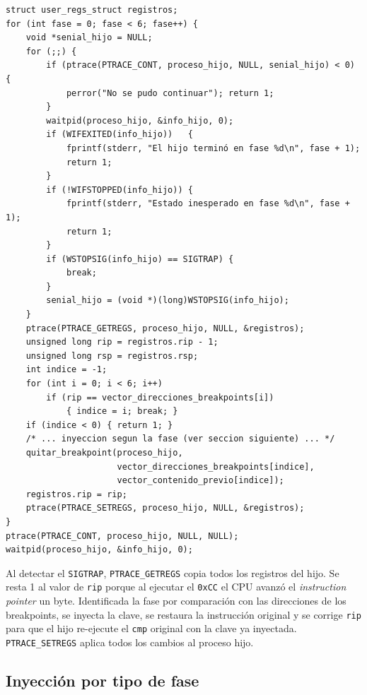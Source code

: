 \documentclass[10pt,a4paper]{article}
\begin{document}
\begin{lstlisting}[style=cstyle, caption={Loop de procesamiento de breakpoints}]
struct user_regs_struct registros;
for (int fase = 0; fase < 6; fase++) {
    void *senial_hijo = NULL;
    for (;;) {
        if (ptrace(PTRACE_CONT, proceso_hijo, NULL, senial_hijo) < 0) {
            perror("No se pudo continuar"); return 1;
        }
        waitpid(proceso_hijo, &info_hijo, 0);
        if (WIFEXITED(info_hijo))   {
            fprintf(stderr, "El hijo terminó en fase %d\n", fase + 1);
            return 1;
        }
        if (!WIFSTOPPED(info_hijo)) {
            fprintf(stderr, "Estado inesperado en fase %d\n", fase + 1);
            return 1;
        }
        if (WSTOPSIG(info_hijo) == SIGTRAP) {
            break;
        }
        senial_hijo = (void *)(long)WSTOPSIG(info_hijo);
    }
    ptrace(PTRACE_GETREGS, proceso_hijo, NULL, &registros);
    unsigned long rip = registros.rip - 1;
    unsigned long rsp = registros.rsp;
    int indice = -1;
    for (int i = 0; i < 6; i++)
        if (rip == vector_direcciones_breakpoints[i])
            { indice = i; break; }
    if (indice < 0) { return 1; }
    /* ... inyeccion segun la fase (ver seccion siguiente) ... */
    quitar_breakpoint(proceso_hijo,
                      vector_direcciones_breakpoints[indice],
                      vector_contenido_previo[indice]);
    registros.rip = rip;
    ptrace(PTRACE_SETREGS, proceso_hijo, NULL, &registros);
}
ptrace(PTRACE_CONT, proceso_hijo, NULL, NULL);
waitpid(proceso_hijo, &info_hijo, 0);
\end{lstlisting}

Al detectar el \texttt{SIGTRAP}, \texttt{PTRACE\_GETREGS} copia todos los registros del hijo. Se resta 1 al valor de \texttt{rip} porque al ejecutar el \texttt{0xCC} el CPU avanzó el \textit{instruction pointer} un byte. Identificada la fase por comparación con las direcciones de los breakpoints, se inyecta la clave, se restaura la instrucción original y se corrige \texttt{rip} para que el hijo re-ejecute el \texttt{cmp} original con la clave ya inyectada. \texttt{PTRACE\_SETREGS} aplica todos los cambios al proceso hijo.

\subsection{Inyección por tipo de fase}
\end{document}
